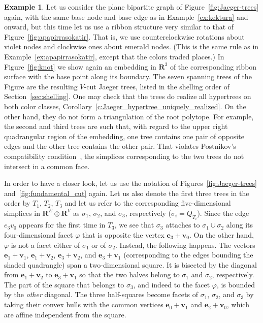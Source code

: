 \documentclass[10pt]{amsart}
\theoremstyle{definition}\newtheorem{defi}[theo]{Definition}
\newtheorem{exam}[theo]{Example}
\theoremstyle{remark}\newtheorem{rema}[theo]{Remark}
\newcommand{\R}{\mathbf{R}}
\begin{document}
\begin{exam}
\label{ex:non-triangulation}
Let us consider the plane bipartite graph of Figure~\ref{fig:Jaeger-trees} again, with the same base node and base edge as in Example~\ref{ex:kektura} and onward, but this time let us use a ribbon structure very similar to that of Figure~\ref{fig:apapirrasokatir}. That is, we use counterclockwise rotations about violet nodes and clockwise ones about emerald nodes. (This is the same rule as in Example~\ref{ex:apapirrasokatir}, except that the colors traded places.) In Figure~\ref{fig:knot} we show again an embedding in $\R^3$ of the corresponding ribbon surface with the base point along its boundary. The seven spanning trees of the Figure are the resulting $V$-cut Jaeger trees, listed in the shelling order of Section~\ref{sec:shelling}. One may check that the trees do realize all hypertrees on both color classes, \cf Corollary~\ref{c:Jaeger_hypertree_uniquely_realized}. On the other hand, they do not form a triangulation of the root polytope. For example, the second and third trees are such that, with regard to the upper right quadrangular region of the embedding, one tree contains one pair of opposite edges and the other tree contains the other pair. That violates Postnikov's compatibility condition~\cite[Lemma~12.6]{alex}, \ie the simplices corresponding to the two trees do not intersect in a common face.

In order to have a closer look, let us use the notation of Figures~\ref{fig:Jaeger-trees} and~\ref{fig:fundamental_cut} again. Let us also denote the first three trees in the order by $T_1$, $T_2$, $T_3$ and let us refer to the corresponding five-dimensional simplices in $\R^E\oplus\R^V$ as $\sigma_1$, $\sigma_2$, and $\sigma_3$, respectively (\ie $\sigma_i=Q_{T_i}$). Since the edge $e_3v_0$ appears for the first time in $T_3$, we see that $\sigma_3$ attaches to $\sigma_1\cup\sigma_2$ along its four-dimensional facet $\varphi$ that is opposite the vertex $\mathbf e_3+\mathbf v_0$. On the other hand, $\varphi$ is not a facet either of $\sigma_1$ or of $\sigma_2$. Instead, the following happens. The vectors $\mathbf e_1+\mathbf v_1$, $\mathbf e_1+\mathbf v_2$, $\mathbf e_3+\mathbf v_2$, and $\mathbf e_3+\mathbf v_1$ (corresponding to the edges bounding the shaded quadrangle) span a two-dimensional square. It is bisected by the diagonal from $\mathbf e_1+\mathbf v_2$ to $\mathbf e_3+\mathbf v_1$ so that the two halves belong to $\sigma_1$ and $\sigma_2$, respectively. The part of the square that belongs to $\sigma_3$, and indeed to the facet $\varphi$, is bounded by the \emph{other} diagonal. The three half-squares become facets of $\sigma_1$, $\sigma_2$, and $\sigma_3$ by taking their convex hulls with the common vertices $\mathbf e_0+\mathbf v_1$ and $\mathbf e_2+\mathbf v_0$, which are affine independent from the square.
\end{exam}
\end{document}
